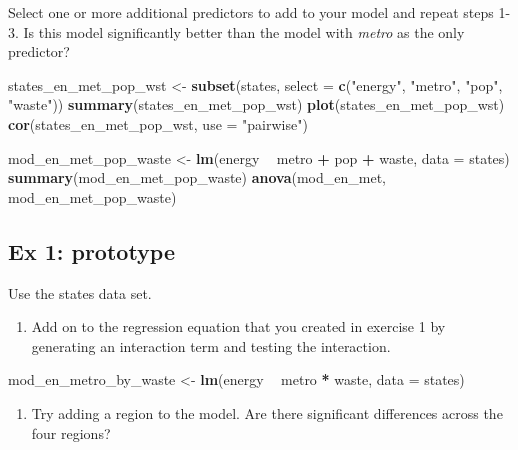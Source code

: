 \documentclass[]{book}
\newenvironment{Shaded}{\begin{snugshade}}{\end{snugshade}}
\newcommand{\KeywordTok}[1]{\textcolor[rgb]{0.13,0.29,0.53}{\textbf{#1}}}
\newcommand{\DataTypeTok}[1]{\textcolor[rgb]{0.13,0.29,0.53}{#1}}
\newcommand{\StringTok}[1]{\textcolor[rgb]{0.31,0.60,0.02}{#1}}
\newcommand{\OperatorTok}[1]{\textcolor[rgb]{0.81,0.36,0.00}{\textbf{#1}}}
\newcommand{\NormalTok}[1]{#1}
\providecommand{\tightlist}{%
  \setlength{\itemsep}{0pt}\setlength{\parskip}{0pt}}
\begin{document}
Select one or more additional predictors to add to your model and repeat
steps 1-3. Is this model significantly better than the model with
\emph{metro} as the only predictor?

\begin{Shaded}
\begin{Highlighting}[]
\NormalTok{  states_en_met_pop_wst <-}\StringTok{ }\KeywordTok{subset}\NormalTok{(states, }\DataTypeTok{select =} \KeywordTok{c}\NormalTok{(}\StringTok{"energy"}\NormalTok{, }\StringTok{"metro"}\NormalTok{, }\StringTok{"pop"}\NormalTok{, }\StringTok{"waste"}\NormalTok{))}
  \KeywordTok{summary}\NormalTok{(states_en_met_pop_wst)}
  \KeywordTok{plot}\NormalTok{(states_en_met_pop_wst)}
  \KeywordTok{cor}\NormalTok{(states_en_met_pop_wst, }\DataTypeTok{use =} \StringTok{"pairwise"}\NormalTok{)}

\NormalTok{  mod_en_met_pop_waste <-}\StringTok{ }\KeywordTok{lm}\NormalTok{(energy }\OperatorTok{~}\StringTok{ }\NormalTok{metro }\OperatorTok{+}\StringTok{ }\NormalTok{pop }\OperatorTok{+}\StringTok{ }\NormalTok{waste, }\DataTypeTok{data =}\NormalTok{ states)}
  \KeywordTok{summary}\NormalTok{(mod_en_met_pop_waste)}
  \KeywordTok{anova}\NormalTok{(mod_en_met, mod_en_met_pop_waste)}
\end{Highlighting}
\end{Shaded}

\subsection{Ex 1: prototype}\label{ex-1-prototype-1}

Use the states data set.

\begin{enumerate}
\def\labelenumi{\arabic{enumi}.}
\tightlist
\item
  Add on to the regression equation that you created in exercise 1 by
  generating an interaction term and testing the interaction.
\end{enumerate}

\begin{Shaded}
\begin{Highlighting}[]
\NormalTok{  mod_en_metro_by_waste <-}\StringTok{ }\KeywordTok{lm}\NormalTok{(energy }\OperatorTok{~}\StringTok{ }\NormalTok{metro }\OperatorTok{*}\StringTok{ }\NormalTok{waste, }\DataTypeTok{data =}\NormalTok{ states)}
\end{Highlighting}
\end{Shaded}

\begin{enumerate}
\def\labelenumi{\arabic{enumi}.}
\setcounter{enumi}{1}
\tightlist
\item
  Try adding a region to the model. Are there significant differences
  across the four regions?
\end{enumerate}
\end{document}
